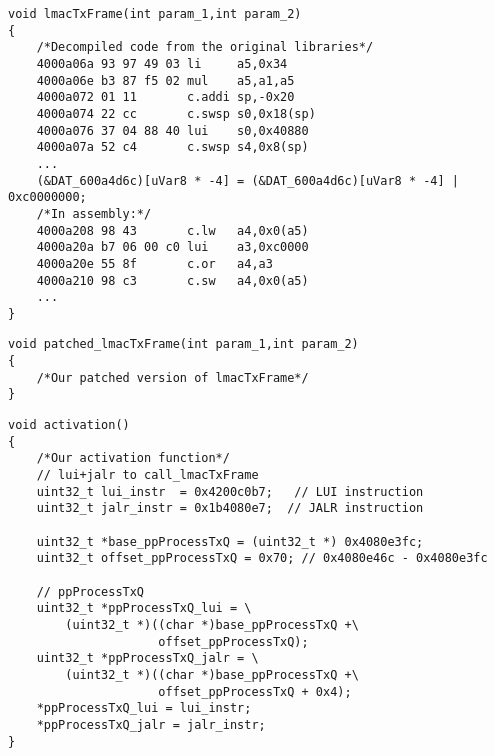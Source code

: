 \newsavebox\funlmactxframe


\begin{lrbox}{\funlmactxframe}
\begin{lstlisting}
void lmacTxFrame(int param_1,int param_2)
{
    /*Decompiled code from the original libraries*/
    4000a06a 93 97 49 03 li     a5,0x34
    4000a06e b3 87 f5 02 mul    a5,a1,a5
    4000a072 01 11       c.addi sp,-0x20
    4000a074 22 cc       c.swsp s0,0x18(sp)
    4000a076 37 04 88 40 lui    s0,0x40880
    4000a07a 52 c4       c.swsp s4,0x8(sp)
    ...
    (&DAT_600a4d6c)[uVar8 * -4] = (&DAT_600a4d6c)[uVar8 * -4] | 0xc0000000;
    /*In assembly:*/
    4000a208 98 43       c.lw   a4,0x0(a5)
    4000a20a b7 06 00 c0 lui    a3,0xc0000
    4000a20e 55 8f       c.or   a4,a3
    4000a210 98 c3       c.sw   a4,0x0(a5)
    ...
}
\end{lstlisting}
\end{lrbox}

\newsavebox\funpatchlmactxframe
\begin{lrbox}{\funpatchlmactxframe}
\begin{lstlisting}
void patched_lmacTxFrame(int param_1,int param_2)
{
    /*Our patched version of lmacTxFrame*/
}
\end{lstlisting}
\end{lrbox}

\newsavebox\funactivation
\begin{lrbox}{\funactivation}
\begin{lstlisting}
void activation()
{
    /*Our activation function*/
    // lui+jalr to call_lmacTxFrame
    uint32_t lui_instr  = 0x4200c0b7;   // LUI instruction
    uint32_t jalr_instr = 0x1b4080e7;  // JALR instruction

    uint32_t *base_ppProcessTxQ = (uint32_t *) 0x4080e3fc;
    uint32_t offset_ppProcessTxQ = 0x70; // 0x4080e46c - 0x4080e3fc

    // ppProcessTxQ
    uint32_t *ppProcessTxQ_lui = \
        (uint32_t *)((char *)base_ppProcessTxQ +\
                     offset_ppProcessTxQ);
    uint32_t *ppProcessTxQ_jalr = \
        (uint32_t *)((char *)base_ppProcessTxQ +\
                     offset_ppProcessTxQ + 0x4);
    *ppProcessTxQ_lui = lui_instr;
    *ppProcessTxQ_jalr = jalr_instr;    
}
\end{lstlisting}
\end{lrbox}

